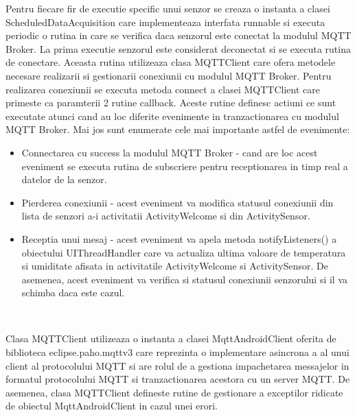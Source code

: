 Pentru fiecare fir de executie specific unui senzor se creaza o instanta a clasei ScheduledDataAcquisition care implementeaza interfata runnable si executa periodic o rutina 
in care se verifica daca senzorul este conectat la modulul MQTT Broker. La prima executie senzorul este considerat deconectat si se executa rutina de conectare. 
Aceasta rutina utilizeaza clasa MQTTClient care ofera metodele necesare realizarii si gestionarii conexiunii cu modulul MQTT Broker. Pentru realizarea conexiunii se 
executa metoda connect a clasei MQTTClient care primeste ca paramterii 2 rutine callback. Aceste rutine definesc actiuni ce sunt executate atunci cand au loc 
diferite evenimente in tranzactionarea cu modulul MQTT Broker. Mai jos sunt enumerate cele mai importante astfel de evenimente:
\begin{itemize}
	\item Connectarea cu success la modulul MQTT Broker - cand are loc acest eveniment se executa rutina de subscriere pentru receptionarea in timp real a datelor de la 
	senzor.
	\item Pierderea conexiunii - acest eveniment va modifica statusul conexiunii din lista de senzori a-i activitatii ActivityWelcome si din ActivitySensor.
	\item Receptia unui mesaj - acest eveniment va apela metoda notifyListeners() a obiectului UIThreadHandler care va actualiza ultima valoare de temperatura si 
	umiditate afisata in activitatile ActivityWelcome si ActivitySensor. De asemenea, acest eveniment va verifica si statusul conexiunii senzorului si il va schimba 
	daca este cazul.
\end{itemize}

\

Clasa MQTTClient utilizeaza o instanta a clasei MqttAndroidClient oferita de biblioteca eclipse.paho.mqttv3 care reprezinta o implementare asincrona a 
al unui client al protocolului MQTT si are rolul de a gestiona impachetarea messajelor in formatul protocolului MQTT si tranzactionarea acestora cu un server MQTT. De asemenea, 
clasa MQTTClient defineste rutine de gestionare a exceptilor ridicate de obiectul MqttAndroidClient in cazul unei erori. 

